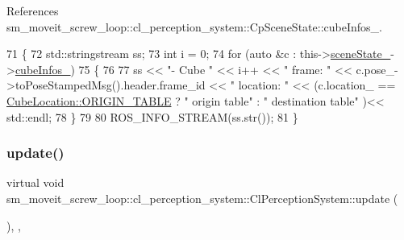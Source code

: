 References sm\+\_\+moveit\+\_\+screw\+\_\+loop\+::cl\+\_\+perception\+\_\+system\+::\+Cp\+Scene\+State\+::cube\+Infos\+\_\+.


\begin{DoxyCode}
71             \{
72                 std::stringstream ss;
73                 \textcolor{keywordtype}{int} i = 0;
74                 \textcolor{keywordflow}{for} (\textcolor{keyword}{auto} &c : this->\hyperlink{classsm__moveit__screw__loop_1_1cl__perception__system_1_1ClPerceptionSystem_abb08b3cc6d4ec414a608da92133b1f66}{sceneState\_}->\hyperlink{classsm__moveit__screw__loop_1_1cl__perception__system_1_1CpSceneState_afef6eaf7eb94cf74b9333a373b2fb35d}{cubeInfos\_})
75                 \{
76 
77                     ss << \textcolor{stringliteral}{"- Cube "} << i++ << \textcolor{stringliteral}{" frame: "} << c.pose\_->toPoseStampedMsg().header.frame\_id << \textcolor{stringliteral}{
      " location: "} << (c.location\_ == \hyperlink{namespacesm__moveit__screw__loop_1_1cl__perception__system_a3685ee11048648ccb59214d2341fb8caae5ee34c3ef8ec4a46a00a218416c7b1d}{CubeLocation::ORIGIN\_TABLE} ? \textcolor{stringliteral}{" origin table"} : \textcolor{stringliteral}{"
       destination table"} )<< std::endl;
78                 \}
79 
80                 ROS\_INFO\_STREAM(ss.str());
81             \}
\end{DoxyCode}
\mbox{\label{classsm__moveit__screw__loop_1_1cl__perception__system_1_1ClPerceptionSystem_a171e1bf0334b2eb957792ecb3ad11b7a}} 
\subsubsection{\texorpdfstring{update()}{update()}}
{\footnotesize\ttfamily virtual void sm\+\_\+moveit\+\_\+screw\+\_\+loop\+::cl\+\_\+perception\+\_\+system\+::\+Cl\+Perception\+System\+::update (\begin{DoxyParamCaption}{ }\end{DoxyParamCaption})\hspace{0.3cm}{\ttfamily [inline]}, {\ttfamily [override]}, {\ttfamily [virtual]}}



